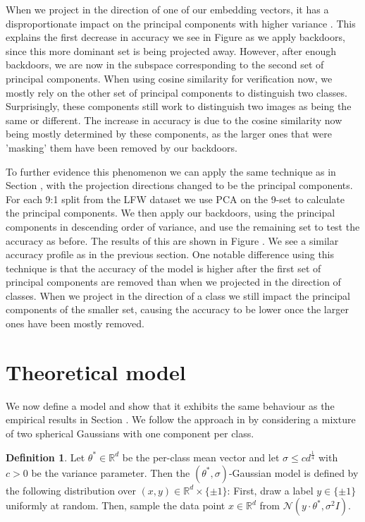 \documentclass{article}
\theoremstyle{plain}
\theoremstyle{definition}
\newtheorem{definition}[theorem]{Definition}
\theoremstyle{remark}
\begin{document}
When we project in the direction of one of our embedding vectors, it has a disproportionate impact on the principal components with higher variance . This explains the first decrease in accuracy we see in Figure  as we apply backdoors, since this more dominant set is being projected away. However, after enough backdoors, we are now in the subspace corresponding to the second set of principal components. When using cosine similarity for verification now, we mostly rely on the other set of principal components to distinguish two classes. Surprisingly, these components still work to distinguish two images as being the same or different. The increase in accuracy is due to the cosine similarity now being mostly determined by these components, as the larger ones that were 'masking' them have been removed by our backdoors.

To further evidence this phenomenon we can apply the same technique as in Section , with the projection directions changed to be the principal components. For each 9:1 split from the LFW dataset we use PCA on the 9-set to calculate the principal components. We then apply our backdoors, using the principal components in descending order of variance, and use the remaining set to test the accuracy as before. The results of this are shown in Figure \todo{}. We see a similar accuracy profile as in the previous section. One notable difference using this technique is that the accuracy of the model is higher after the first set of principal components are removed than when we projected in the direction of classes. When we project in the direction of a class we still impact the principal components of the smaller set, causing the accuracy to be lower once the larger ones have been mostly removed.

\section{Theoretical model}
\label{Theoretical model}
We now define a model and show that it exhibits the same behaviour as the empirical results in Section . We follow the approach in  by considering a mixture of two spherical Gaussians with one component per class.

\begin{definition}
    \label{def:gaussian-model}
    Let \( \theta^{*}\in\mathbb{R}^d \) be the per-class mean vector and let \( \sigma \leq cd^{\frac{1}{4}} \) with \( c>0 \) be the variance parameter. Then the \( (\theta^*, \sigma) \)-Gaussian model is defined by the following distribution over \( (x,y)\in\mathbb{R}^d\times\{\pm1\} \): First, draw a label \( y\in\{\pm1\} \) uniformly at random. Then, sample the data point \( x\in\mathbb{R}^d \) from \( \mathcal{N}(y\cdot\theta^*, \sigma^2I) \).
\end{definition}
\end{document}
